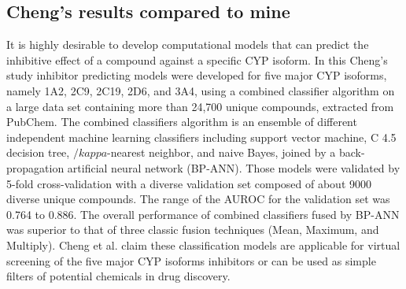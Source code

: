 


\subsection{Cheng's results compared to mine}
It is highly desirable to develop computational models that can predict the inhibitive effect of a compound against a specific CYP isoform. In this Cheng's study inhibitor predicting models were developed for five major CYP isoforms, namely 1A2, 2C9, 2C19, 2D6, and 3A4, using a combined classifier algorithm on a large data set containing more than 24,700 unique compounds, extracted from PubChem. The combined classifiers algorithm is an ensemble of different independent machine learning classifiers including support vector machine, C 4.5 decision tree, $/kappa$-nearest neighbor, and naive Bayes, joined by a back-propagation artificial neural network (BP-ANN). Those models were validated by 5-fold cross-validation with a diverse validation set composed of about 9000 diverse unique compounds. The range of the AUROC for the validation set was 0.764 to 0.886. The overall performance of combined classifiers fused by BP-ANN was superior to that of three classic fusion techniques (Mean, Maximum, and Multiply). Cheng et al. claim these classification models are applicable for virtual screening of the five major CYP isoforms inhibitors or can be used as simple filters of potential chemicals in drug discovery.\cite{Cheng2011}

